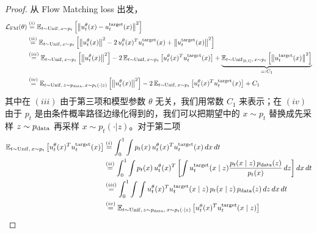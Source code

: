 \begin{proof}
从 Flow Matching loss 出发，
\begin{equation*}
\begin{aligned}
\mathcal{L}_{\mathrm{FM}}(\theta)
&\overset{(i)}{=}
\mathbb{E}_{t \sim \mathrm{Unif},\, x \sim p_t}
\left[
\left\|
u_t^\theta(x)
-
u_t^{\mathrm{target}}(x)
\right\|^2
\right] \\
&\overset{(ii)}{=}
\mathbb{E}_{t \sim \mathrm{Unif},\, x \sim p_t}
\left[
\left\|
u_t^\theta(x)
\right\|^2
-
2\,u_t^\theta(x)^{T}
u_t^{\mathrm{target}}(x)
+
\left\|
u_t^{\mathrm{target}}(x)
\right\|^2
\right] \\
&\overset{(iii)}{=}
\mathbb{E}_{t \sim \mathrm{Unif},\, x \sim p_t}
\left[
\left\|
u_t^\theta(x)
\right\|^2
\right]
-
2\,
\mathbb{E}_{t \sim \mathrm{Unif},\, x \sim p_t}
\left[
u_t^\theta(x)^{T}
u_t^{\mathrm{target}}(x)
\right]
+
\underbrace{
\mathbb{E}_{t \sim \mathrm{Unif}_{[0,1]},\, x \sim p_t}
\left[
\left\|
u_t^{\mathrm{target}}(x)
\right\|^2
\right]
}_{=:C_1} \\
&\overset{(iv)}{=}
\mathbb{E}_{t \sim \mathrm{Unif},\, z \sim p_{\mathrm{data}},\, x \sim p_t(\cdot \mid z)}
\left[
\left\|
u_t^\theta(x)
\right\|^2
\right]
-
2\,
\mathbb{E}_{t \sim \mathrm{Unif},\, x \sim p_t}
\left[
u_t^\theta(x)^{T}
u_t^{\mathrm{target}}(x)
\right]
+
C_1
\end{aligned}
\end{equation*}
其中在 $(iii)$ 由于第三项和模型参数 $\theta$ 无关，我们用常数 $C_1$ 来表示；在 $(iv)$ 由于 $p_t$ 是由条件概率路径边缘化得到的，我们可以把期望中的 $x \sim p_t$ 替换成先采样 $z \sim p_{\mathrm{data}}$ 再采样 $x \sim p_t(\cdot|z)$。对于第二项
\begin{equation*}
\begin{aligned}
\mathbb{E}_{t \sim \mathrm{Unif},\, x \sim p_t}
\left[
u_t^\theta(x)^T
u_t^{\mathrm{target}}(x)
\right]
&\overset{(i)}{=}
\int_0^1
\int
p_t(x)\,
u_t^\theta(x)^T
u_t^{\mathrm{target}}(x)
\,dx\,dt \\
&\overset{(ii)}{=}
\int_0^1
\int
p_t(x)\,
u_t^\theta(x)^T
\left[
\int
u_t^{\mathrm{target}}(x \mid z)
\frac{
p_t(x \mid z)\,
\data(z)
}{
p_t(x)
}
\,dz
\right]
dx\,dt \\
&\overset{(iii)}{=}
\int_0^1
\int
\int
u_t^\theta(x)^T
u_t^{\mathrm{target}}(x \mid z)\,
p_t(x \mid z)\,
\data(z)
\,dz\,dx\,dt \\
&\overset{(iv)}{=}
\mathbb{E}_{t \sim \mathrm{Unif},\, z \sim \data,\, x \sim p_t(\cdot \mid z)}
\left[
u_t^\theta(x)^T
u_t^{\mathrm{target}}(x \mid z)
\right]
\end{aligned}

\end{equation*}
\end{proof}
